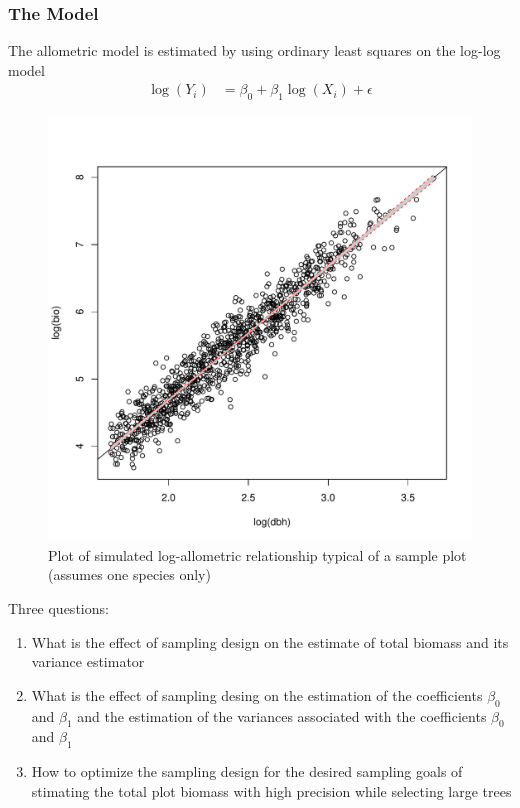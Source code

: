 \documentclass{beamer}
\begin{document}
\begin{frame}
  \frametitle{The Model}
The allometric model is estimated by using ordinary least squares on the log-log model\\
  \begin{align}
  \label{2}
    \log(Y_i) & = \beta_0 + \beta_1 \log(X_i) + \epsilon
  \end{align}
  \begin{figure}
    \centering
    \caption{Plot of simulated log-allometric relationship typical of a sample plot (assumes one species only)}
    \includegraphics[scale = 0.15]{dbhLogModel}
  \end{figure}
\end{frame}
%
\begin{frame}
  Three questions:
  \begin{enumerate}
  \item What is the effect of sampling design on the estimate of total biomass and its variance estimator \vspace{3mm}
  \item What is the effect of sampling desing on the estimation of the coefficients $\beta_0$ and $\beta_1$ and the estimation of the variances associated with the coefficients $\beta_0$ and $\beta_1$ \vspace{3mm}
  \item How to optimize the sampling design for the desired sampling goals of stimating the total plot biomass with high precision while selecting large trees
  \end{enumerate}
\end{frame}
\end{document}
